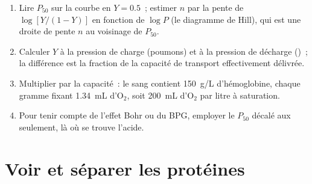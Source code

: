 \begin{method}\label{met:b1:proteins:hill}
\begin{enumerate}
  \item Lire $P_{50}$ sur la courbe en $Y = 0.5$~; estimer $n$ par la
        pente de $\log[Y/(1-Y)]$ en fonction de $\log P$ (le
        diagramme de Hill), qui est une droite de pente $n$ au
        voisinage de $P_{50}$.
  \item Calculer $Y$ à la pression de charge (poumons) et à la pression
        de décharge ()~; la différence est la fraction de la
        capacité de transport effectivement délivrée.
  \item Multiplier par la capacité~: le sang contient \qty{150}{g/L}
        d'hémoglobine, chaque gramme fixant \qty{1.34}{mL}
        d'$\mathrm{O_2}$, soit \qty{200}{mL} d'$\mathrm{O_2}$ par litre
        à saturation.
  \item Pour tenir compte de l'effet Bohr ou du BPG, employer le
        $P_{50}$ décalé aux  seulement, là où se trouve l'acide.
\end{enumerate}
\end{method}

\section{Voir et séparer les protéines}

